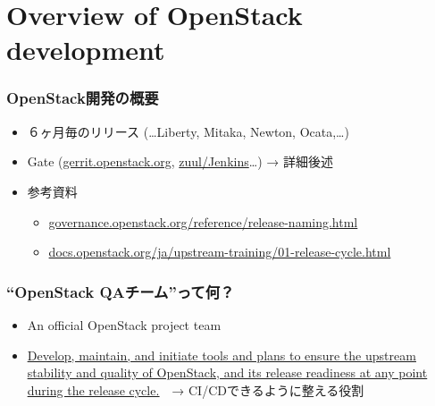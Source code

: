 \documentclass[aspectratio=169,11pt,hyperref={colorlinks=true}]{beamer}
\begin{document}
\section{Overview of OpenStack development}
\begin{frame}
  \frametitle{OpenStack開発の概要}
  \begin{itemize}
    \item ６ヶ月毎のリリース (\ldots Liberty, Mitaka, Newton, Ocata,\ldots)
    \item Gate (\href{https://gerrit.openstack.org}{gerrit.openstack.org},
      \href{http://zuul.openstack.org/}{zuul/Jenkins}\ldots) → 詳細後述
    \item 参考資料
      \begin{itemize}
        \item \href{http://governance.openstack.org/reference/release-naming.html}{governance.openstack.org/reference/release-naming.html}
        \item \href{http://docs.openstack.org/ja/upstream-training/01-release-cycle.html}{docs.openstack.org/ja/upstream-training/01-release-cycle.html}
      \end{itemize}
  \end{itemize}
\end{frame}

\begin{frame}
  \frametitle{``OpenStack QAチーム''って何？}
  \begin{itemize}
    \item An official OpenStack project team
    \item \href{https://wiki.openstack.org/wiki/QA}{\ul{Develop, maintain,
      and initiate tools and plans to ensure the upstream stability
      and quality of OpenStack, and its release readiness at any point
      during the release cycle.}}　→ CI/CDできるように整える役割
  \end{itemize}
\end{frame}
\end{document}
